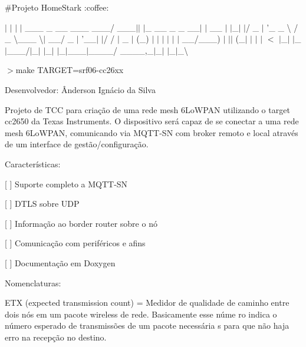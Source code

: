 \#\+Projeto Home\+Stark \+:coffee\+: 

 $\vert$ $\vert$ $\vert$ $\vert$ \+\_\+\+\_\+\+\_\+ \+\_\+ \+\_\+\+\_\+ \+\_\+\+\_\+\+\_\+ \+\_\+\+\_\+\+\_\+/ \+\_\+\+\_\+\+\_\+$\vert$$\vert$ $\vert$\+\_\+ \+\_\+\+\_\+ \+\_\+ \+\_\+ \+\_\+\+\_\+$\vert$ $\vert$ \+\_\+\+\_\+ $\vert$ $\vert$\+\_\+$\vert$ $\vert$/ \+\_\+ $|$ '\+\_\+ {\ttfamily \+\_\+ \textbackslash{} / \+\_\+ \textbackslash{}\+\_\+\+\_\+\+\_\+ \textbackslash{}$\vert$ \+\_\+\+\_\+/ \+\_\+} $\vert$ '\+\_\+\+\_\+$\vert$ $\vert$/ / $\vert$ \+\_\+ $\vert$ (\+\_\+) $\vert$ $\vert$ $\vert$ $\vert$ $\vert$ $\vert$ \+\_\+\+\_\+/\+\_\+\+\_\+\+\_\+) $\vert$ $\vert$$\vert$ (\+\_\+$\vert$ $\vert$ $\vert$ $\vert$ $<$ $\vert$\+\_\+$\vert$ $\vert$\+\_\+$\vert$\+\_\+\+\_\+\+\_\+/$\vert$\+\_\+$\vert$ $\vert$\+\_\+$\vert$ $\vert$\+\_\+$\vert$\+\_\+\+\_\+\+\_\+$\vert$\+\_\+\+\_\+\+\_\+\+\_\+/ \+\_\+\+\_\+\+\_\+\+\_\+,\+\_\+$\vert$\+\_\+$\vert$ $\vert$\+\_\+$\vert$\+\_\+\textbackslash{}

$>$make T\+A\+R\+G\+E\+T=srf06-\/cc26xx

Desenvolvedor\+: Ânderson Ignácio da Silva

Projeto de T\+C\+C para criação de uma rede mesh 6\+Lo\+W\+P\+A\+N utilizando o target cc2650 da Texas Instruments. O dispositivo será capaz de se conectar a uma rede mesh 6\+Lo\+W\+P\+A\+N, comunicando via M\+Q\+T\+T-\/\+S\+N com broker remoto e local através de um interface de gestão/configuração.

Características\+:
\begin{DoxyItemize}
\item \mbox{[} \mbox{]} Suporte completo a M\+Q\+T\+T-\/\+S\+N
\item \mbox{[} \mbox{]} D\+T\+L\+S sobre U\+D\+P
\item \mbox{[} \mbox{]} Informação ao border router sobre o nó
\item \mbox{[} \mbox{]} Comunicação com periféricos e afins
\item \mbox{[} \mbox{]} Documentação em Doxygen
\end{DoxyItemize}

Nomenclaturas\+:

E\+T\+X (expected transmission count) = Medidor de qualidade de caminho entre dois nós em um pacote wireless de rede. Basicamente esse núme ro indica o número esperado de transmissões de um pacote necessária s para que não haja erro na recepção no destino. 